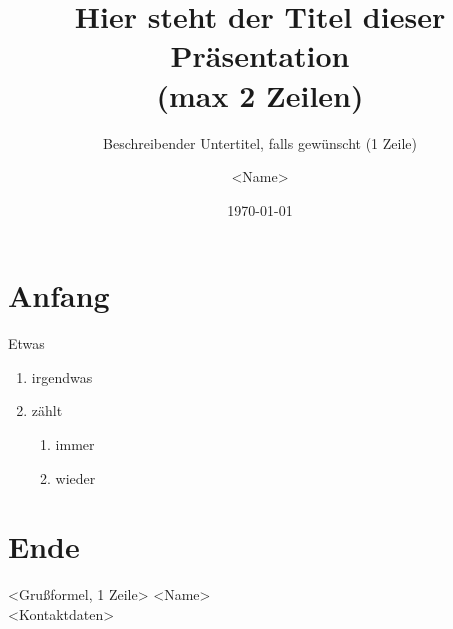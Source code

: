 \documentclass[fleqn,11pt,aspectratio=169]{beamer}
\title[kurzer Titel]{Hier steht der Titel dieser Präsentation\\ (max 2 Zeilen)}
\subtitle{Beschreibender Untertitel, falls gewünscht (1 Zeile)}
\author[Kurzname]{\textless{}Name\textgreater}
\date{\today}
\begin{document}
\begin{frame}[plain]
  \titlepage
\end{frame}


\section{Anfang}

\begin{frame}{Etwas}
\begin{enumerate}
\item irgendwas
\item zählt
  \begin{enumerate}
  \item immer
  \item wieder
  \end{enumerate}
\end{enumerate}
\end{frame}

\section{Ende}

\begin{finalframe}{\textless{}Grußformel, 1 Zeile\textgreater}
\textless{}Name\textgreater\\
\textless{}Kontaktdaten\textgreater
\end{finalframe}
\end{document}
